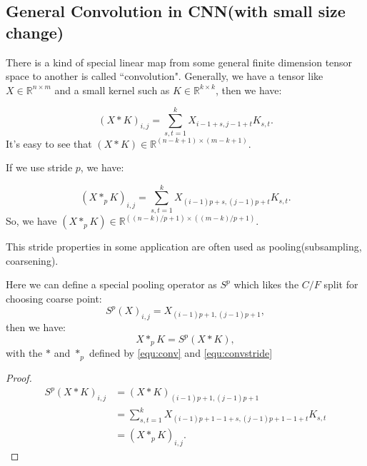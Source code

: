 \subsection{General Convolution in CNN(with small size change)}
There is a kind of special linear map from some general finite dimension tensor space to another is called ``convolution".  Generally, we have a tensor like $X \in \mathbb{R}^{n \times m}$ and a small kernel such as $K \in \mathbb{R}^{k\times k}$, then we have:
\begin{definition}
\begin{equation}\label{equ:conv}
(X\ast K)_{i,j} = \sum_{s, t = 1}^k X_{i-1 + s, j-1 + t} K_{s,t}.
\end{equation}
It's easy to see that $(X\ast K) \in \mathbb{R}^{(n-k + 1) \times (m-k + 1)}$.
\end{definition}
If we use stride $p$, we have:
\begin{definition}
\begin{equation}\label{equ:convstride}
(X\ast_{p} K)_{i,j} = \sum_{s, t = 1}^k X_{(i-1)p + s, (j-1)p + t} K_{s,t}.
\end{equation}
So, we have 
$
(X\ast_p K) \in \mathbb{R}^{((n-k)/p + 1) \times ((m-k)/p+1)}.
$
\end{definition}
This stride properties in some application are often used as pooling(subsampling, coarsening).  

Here we can define a special pooling operator as $S^p$ which likes the $C/F$ split for choosing coarse point:
\begin{equation}
S^p(X)_{i,j} = X_{(i-1)p + 1, (j-1)p + 1},
\end{equation}
then we have:
\begin{equation}\label{equ:stride}
X \ast_p K = S^p(X\ast K),
\end{equation}
with the $\ast$ and $\ast_p$ defined by \ref{equ:conv} and \ref{equ:convstride}
\begin{proof}
\begin{align}
S^p(X \ast K)_{i,j} &= (X \ast K)_{(i-1)p+1, (j-1)p + 1}  \\
&= \sum_{s,t = 1}^k X_{(i-1)p + 1 -1 +s, (j-1)p +1 -1 +t}K_{s,t}  \\
&= (X \ast_p K)_{i,j}.
\end{align}
\end{proof}

